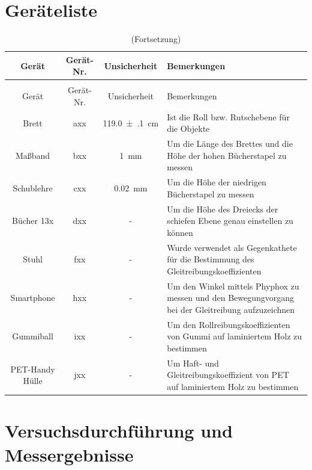 \documentclass[11pt,ngerman]{scrartcl}
\begin{document}
\section{Geräteliste}
\label{sec:geraeteliste}
\begin{longtable}{c|c|S|p{15em}}
\caption[Geräteliste]{Verwendete Geräte \label{tab:geraeteliste}} \\  %
\toprule
Gerät                              & Gerät-Nr. & { Unsicherheit }  & Bemerkungen \\  
\midrule
\endfirsthead
\caption[]{(Fortsetzung)}\\
\toprule
Gerät                              & Gerät-Nr. & { Unsicherheit }  & Bemerkungen \\                                                                        
\midrule
\endhead
\endfoot
\endlastfoot
Brett & axx & \SI{119.0(1)}{\cm}       & Ist die Roll bzw. Rutschebene für die Objekte\\ \hline
        Maßband         & bxx & \SI{1}{\mm}       & Um die Länge des Brettes und die Höhe der hohen Bücherstapel zu messen \\ \hline
        Schublehre      & cxx & \SI{0.02}{\mm}    & Um die Höhe der niedrigen Bücherstapel zu messen \\ \hline
        Bücher 13x & dxx & { - }             & Um die Höhe des Dreiecks der schiefen Ebene genau einstellen zu können\\ \hline
        Stuhl       & fxx & { - }             & Wurde verwendet als Gegenkathete für die Bestimmung des Gleitreibungskoeffizienten\\ \hline
        Smartphone     & hxx & { - }             & Um den Winkel mittels Phyphox zu messen und den Bewegungvorgang bei der Gleitreibung aufzuzeichnen\\ \hline
        Gummiball      & ixx & { - }             & Um den Rollreibungskoeffizienten von Gummi auf laminiertem Holz zu bestimmen \\ \hline
        PET-Handy Hülle     & jxx & {-} & Um Haft- und Gleitreibungskoeffizient von PET auf laminiertem Holz zu bestimmen\\ \hline
        \hline
\end{longtable}

\section{Versuchsdurchführung und Messergebnisse}
\label{sec:versuchsdurchfuehrung_messergebnisse}
\end{document}
